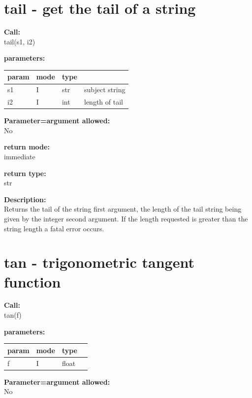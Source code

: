     \section{tail - get the tail of a string}\label{sec:iftail}
        
        {\bf Call:} \\
        tail(s1, i2)
        
        {\bf parameters:} \\
        \begin{tabular}{| l | l | l | l |}
        \hline
        param  & mode & type & \\
        \hline \hline
        s1 & I & str & subject string   \\ \hline
        i2 & I & int & length of tail   \\ \hline
        \end{tabular}
        
        {\bf Parameter=argument allowed:} \\
        No
        
        {\bf return mode:} \\
        immediate

        {\bf return type:} \\
        str
        
        {\bf Description:} \\
        Returns the tail of the string first argument, the length of the
        tail string being given by the integer second argument. If the
        length requested is greater than the string length a fatal error
        occurs.


    \section{tan - trigonometric tangent function}\label{sec:iftan}
        
        
        {\bf Call:} \\
        tan(f)
        
        {\bf parameters:} \\
        \begin{tabular}{| l | l | l | l |}
        \hline
        param  & mode & type & \\
        \hline \hline
        f & I & float & \\ \hline
        \end{tabular}
        
        {\bf Parameter=argument allowed:} \\
        No
        
